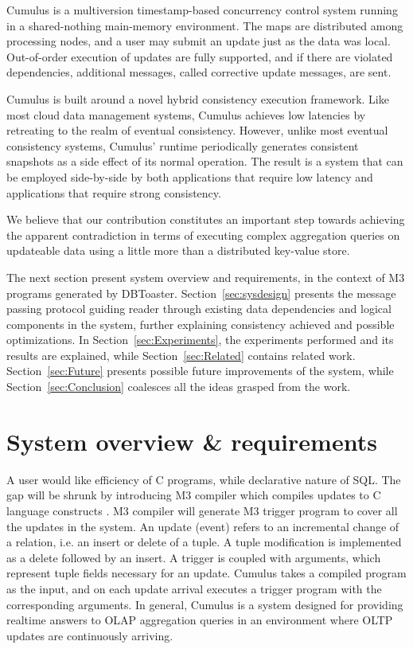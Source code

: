 \documentclass{sig-semester}
\def\M3{M3\xspace}
\begin{document}
Cumulus is a multiversion timestamp-based concurrency control system running in a shared-nothing main-memory environment. The maps are distributed among processing nodes, and a user may submit an update just as the data was local. Out-of-order execution of updates are fully supported, and if there are violated dependencies, additional messages, called corrective update messages, are sent.

Cumulus is built around a novel hybrid consistency execution framework. Like most cloud data management systems, Cumulus achieves low latencies by retreating to the realm of eventual consistency. However, unlike most eventual consistency systems, Cumulus' runtime periodically generates consistent snapshots as a side effect of its normal operation. The result is a system that can be employed side-by-side by both applications that require low latency and applications that require strong consistency.

We believe that our contribution constitutes an important step towards achieving the apparent contradiction in terms of executing complex aggregation queries on updateable data using a little more than a distributed key-value store.

The next section present system overview and requirements, in the context of \M3 programs generated by DBToaster. Section~\ref{sec:sysdesign} presents the message passing protocol guiding reader through existing data dependencies and logical components in the system, further explaining consistency achieved and possible optimizations. In Section~\ref{sec:Experiments}, the experiments performed and its results are explained, while Section~\ref{sec:Related} contains related work. Section~\ref{sec:Future} presents possible future improvements of the system, while Section~\ref{sec:Conclusion} coalesces all the ideas grasped from the work.

\section{System overview \& requirements}
\vspace{2mm}

A user would like efficiency of C programs, while declarative nature of SQL. The gap will be shrunk by introducing \M3 compiler which compiles updates to C language constructs \cite{DBToasterCompiler09}. \M3 compiler will generate \M3 trigger program to cover all the updates in the system. An update (event) refers to an incremental change of a relation, i.e. an insert or delete of a tuple. A tuple modification is implemented as a delete followed by an insert. A trigger is coupled with arguments, which represent tuple fields necessary for an update. Cumulus takes a compiled program as the input, and on each update arrival executes a trigger program with the corresponding arguments. In general, Cumulus is a system designed for providing realtime answers to OLAP aggregation queries in an environment where OLTP updates are continuously arriving.
\end{document}
